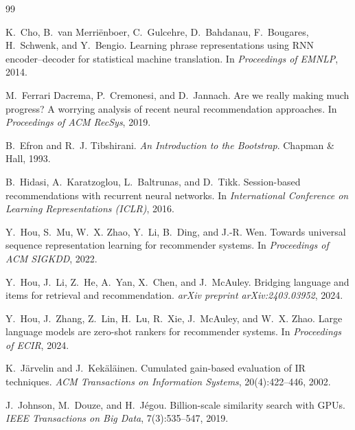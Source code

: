 \documentclass[11pt,a4paper]{article}
\begin{document}

\begin{thebibliography}{99}

K.~Cho, B.~van Merri{\"e}nboer, C.~Gulcehre, D.~Bahdanau, F.~Bougares, H.~Schwenk, and Y.~Bengio.
\newblock Learning phrase representations using {RNN} encoder--decoder for statistical machine translation.
\newblock In \emph{Proceedings of EMNLP}, 2014.

M.~Ferrari Dacrema, P.~Cremonesi, and D.~Jannach.
\newblock Are we really making much progress? {A} worrying analysis of recent neural recommendation approaches.
\newblock In \emph{Proceedings of ACM RecSys}, 2019.

B.~Efron and R.~J. Tibshirani.
\newblock \emph{An Introduction to the Bootstrap}.
\newblock Chapman \& Hall, 1993.

B.~Hidasi, A.~Karatzoglou, L.~Baltrunas, and D.~Tikk.
\newblock Session-based recommendations with recurrent neural networks.
\newblock In \emph{International Conference on Learning Representations (ICLR)}, 2016.

Y.~Hou, S.~Mu, W.~X. Zhao, Y.~Li, B.~Ding, and J.-R. Wen.
\newblock Towards universal sequence representation learning for recommender systems.
\newblock In \emph{Proceedings of ACM SIGKDD}, 2022.

Y.~Hou, J.~Li, Z.~He, A.~Yan, X.~Chen, and J.~McAuley.
\newblock Bridging language and items for retrieval and recommendation.
\newblock \emph{arXiv preprint arXiv:2403.03952}, 2024.

Y.~Hou, J.~Zhang, Z.~Lin, H.~Lu, R.~Xie, J.~McAuley, and W.~X. Zhao.
\newblock Large language models are zero-shot rankers for recommender systems.
\newblock In \emph{Proceedings of ECIR}, 2024.

K.~J{\"a}rvelin and J.~Kek{\"a}l{\"a}inen.
\newblock Cumulated gain-based evaluation of {IR} techniques.
\newblock \emph{ACM Transactions on Information Systems}, 20(4):422--446, 2002.

J.~Johnson, M.~Douze, and H.~J{\'e}gou.
\newblock Billion-scale similarity search with {GPU}s.
\newblock \emph{IEEE Transactions on Big Data}, 7(3):535--547, 2019.


\end{thebibliography}
\end{document}
